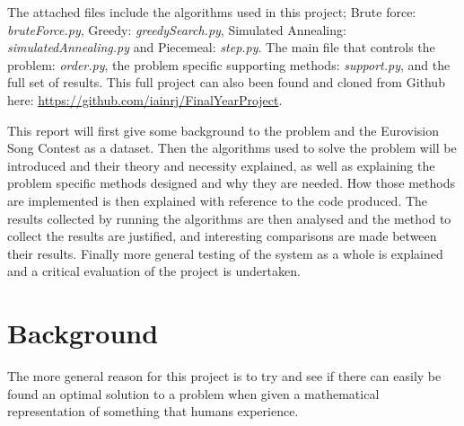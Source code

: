 \documentclass[12pt]{report}
\begin{document}
The attached files include the algorithms used in this project; Brute force: \textit{bruteForce.py}, Greedy: \textit{greedySearch.py}, Simulated Annealing: \textit{simulatedAnnealing.py} and Piecemeal: \textit{step.py}. The main file that controls the problem: \textit{order.py}, the problem specific supporting methods: \textit{support.py}, and the full set of results. This full project can also been found and cloned from Github here: \url{https://github.com/iainrj/FinalYearProject}.

This report will first give some background to the problem and the Eurovision Song Contest as a dataset. Then the algorithms used to solve the problem will be introduced and their theory and necessity explained, as well as explaining the problem specific methods designed and why they are needed. How those methods are implemented is then explained with reference to the code produced. The results collected by running the algorithms are then analysed and the method to collect the results are justified, and interesting comparisons are made between their results. Finally more general testing of the system as a whole is explained and a critical evaluation of the project is undertaken.

\section{Background}\label{Background}
The more general reason for this project is to try and see if there can easily be found an optimal solution to a problem when given a mathematical representation of something that humans experience. 
\end{document}
